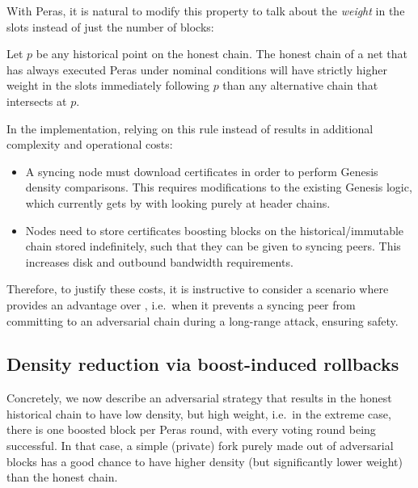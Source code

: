 \medskip
With Peras, it is natural to modify this property to talk about the \emph{weight} in the \sgen{} slots instead of just the number of blocks:
\begin{tcolorbox}[title=\weightedDensityOfCompetingChainsName]\label{property:weighted-density-of-competing-chains}
  Let $p$ be any historical point on the honest chain. The honest chain of a net that has always executed Peras under nominal conditions will have strictly higher weight in the \sgen{} slots immediately following $p$ than any alternative chain that intersects at $p$.
\end{tcolorbox}
In the implementation, relying on this rule instead of \densityOfCompetingChains{} results in additional complexity and operational costs:
\begin{itemize}
\item A syncing node must download certificates in order to perform Genesis density comparisons.
  This requires modifications to the existing Genesis logic, which currently gets by with looking purely at header chains.
\item Nodes need to store certificates boosting blocks on the historical/immutable chain stored indefinitely, such that they can be given to syncing peers.
  This increases disk and outbound bandwidth requirements.
\end{itemize}
Therefore, to justify these costs, it is instructive to consider a scenario where \weightedDensityOfCompetingChains{} provides an advantage over \densityOfCompetingChains{}, i.e.\ when it prevents a syncing peer from committing to an adversarial chain during a long-range attack, ensuring safety.

\subsection{Density reduction via boost-induced rollbacks}

Concretely, we now describe an adversarial strategy that results in the honest historical chain to have low density, but high weight, i.e.\ in the extreme case, there is one boosted block per Peras round, with every voting round being successful.
In that case, a simple (private) fork purely made out of adversarial blocks has a good chance to have higher density (but significantly lower weight) than the honest chain.

